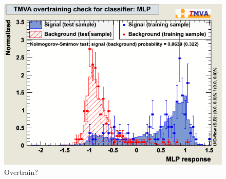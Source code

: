 \begin{figure}[h]
\begin{center}
\includegraphics[width=1.0\textwidth]{images/ahOvertrain_MLP.png}
\caption{Overtrain?}
\label{fig:overtrainmlp}
\end{center}
\end{figure}

\clearpage

